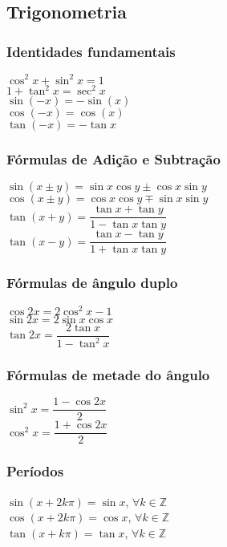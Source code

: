 \subsection*{Trigonometria}
\begin{tcolorbox}
\begin{multicols}{2}
\subsubsection*{Identidades fundamentais}
$\cos^2{x}+\sin^2{x}=1$\\[0.15cm]
$1+\tan^2{x} = \sec^2{x} $\\[0.15cm]
$\sin(-x)=-\sin(x)$\\[0.15cm]
$\cos(-x)=\cos(x)$ \\[0.15cm]
$\tan(-x)=-\tan{x}$

\subsubsection*{Fórmulas de Adição e Subtração}
$\sin(x\pm y)=\sin{x}\cos{y}\pm \cos{x}\sin{y}$\\[0.15cm]
$\cos(x\pm y) = \cos{x}\cos{y}\mp \sin{x}\sin{y}$\\[0.15cm]
$\tan(x+y)=\dfrac{\tan{x}+\tan{y}}{1-\tan{x}\tan{y}}$\\[0.15cm]
$\tan(x-y)=\dfrac{\tan{x}-\tan{y}}{1+\tan{x}\tan{y}}$

\subsubsection*{Fórmulas de ângulo duplo}
$\cos{2x} =2\cos^2{x}-1$\\[0.15cm]
$\sin{2x}=2\sin{x}\cos{x}$\\[0.15cm]
$\tan{2x}=\dfrac{2\tan{x}}{1-\tan^2{x}}$
\subsubsection*{Fórmulas de metade do ângulo}
$\sin^2{x}=\dfrac{1-\cos{2x}}{2}$\\[0.15cm]
$\cos^2{x}=\dfrac{1+\cos{2x}}{2}$
\subsubsection*{Períodos}
$\sin(x+2k\pi)=\sin{x}$, $\forall k \in \mathbb{Z}$\\[0.15cm]
$\cos(x+2k\pi)=\cos{x}$, $\forall k \in \mathbb{Z}$\\[0.15cm]
$\tan(x+k\pi)=\tan{x}$, $\forall k \in \mathbb{Z}$
\end{multicols}

\end{tcolorbox}


